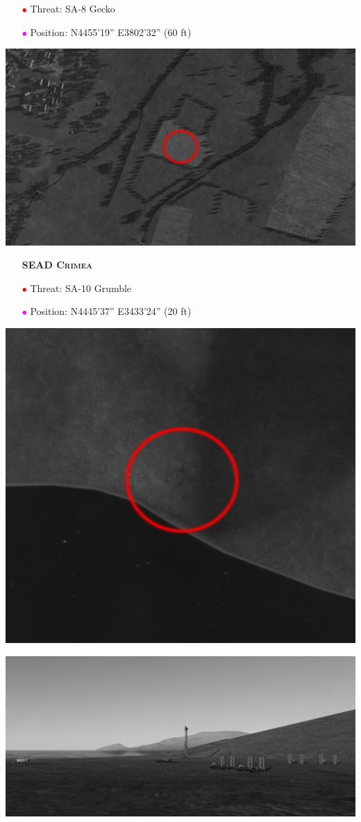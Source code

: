 \documentclass[a4paper,12pt,dvipsnames]{letter}
\newcommand{\Deg}{\textdegree{}}
\newcommand{\DMS}[3]{#1\Deg#2'#3''}
\newcommand{\myHead}[1]{{\LARGE\textsc{\textbf{#1}}}}
\newcommand{\ri}{\textcolor{Red}{$\bullet$\;}}
\newcommand{\mi}{\textcolor{Magenta}{$\bullet$\;}}
\begin{document}
{\begin{center}
\end{center}
%
\begin{itemize}
 \item[\ri] Threat: SA-8 Gecko
 \item[\mi] Position: N\DMS{44}{55}{19} E\DMS{38}{02}{32} (60 ft)
\end{itemize}
%
\begin{center}
\includegraphics[width=0.7\linewidth]{../gimp/SA8_Sat.png}
\end{center}
%
\newpage
\begin{itemize}
 \item[] \myHead{SEAD Crimea}
 \item[\ri] Threat: SA-10 Grumble
 \item[\mi] Position: N\DMS{44}{45}{37} E\DMS{34}{33}{24} (20 ft)
\end{itemize}
\begin{center}
\includegraphics[width=0.7\linewidth]{../gimp/SA10_01.png}
\end{center}
\vspace{1em}
\begin{center}
\includegraphics[width=0.7\linewidth]{../gimp/SA10_02.png}
\end{center}
% 
}
\end{document}
